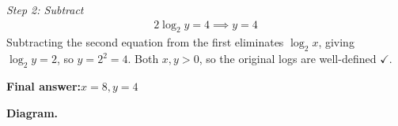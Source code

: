 \documentclass[11pt]{article}
\begin{document}
\textit{Step 2: Subtract}
\[\begin{gathered}
2\log_2 y = 4 \implies y = 4
\end{gathered}\]
Subtracting the second equation from the first eliminates \( \log_2 x \), giving \( \log_2 y = 2 \), so \( y = 2^2 = 4 \). Both \( x, y > 0 \), so the original logs are well-defined $\checkmark$.

\begin{answerbox}
\textbf{Final answer:}\quad \(\displaystyle x = 8, y = 4\)
\end{answerbox}
\textbf{Diagram.}

\begin{center}
\end{center}
\end{document}
